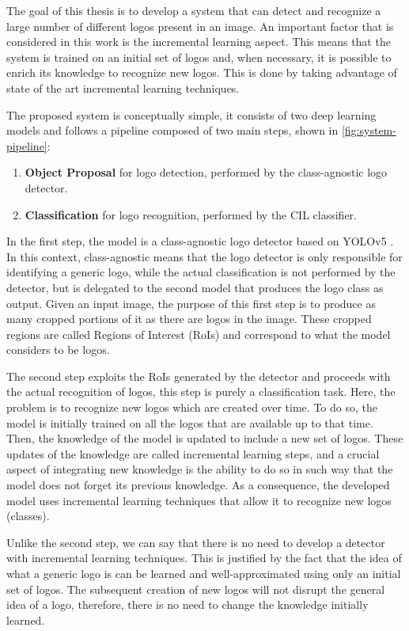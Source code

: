 The goal of this thesis is to develop a system that can detect and recognize 
a large number of different logos present in an image. An important factor that is considered in this work is the incremental learning aspect. This means that the system is trained on an initial set of logos and, when necessary, it is possible to enrich its knowledge to recognize new logos. This is done by taking advantage of state of the art incremental learning techniques.

The proposed system is conceptually simple, it consists of two deep learning models and follows a pipeline composed of two main steps, shown in \autoref{fig:system-pipeline}:

\begin{enumerate}
    \item \textbf{Object Proposal} for logo detection, performed by the class-agnostic logo detector.
    \item \textbf{Classification} for logo recognition, performed by the CIL classifier.
\end{enumerate}

In the first step, the model is a class-agnostic logo detector based on YOLOv5 \cite{glenn_jocher_2021_5563715}. In this context, class-agnostic means that the logo detector is only responsible for identifying a generic logo, while the actual classification is not performed by the detector, but is delegated to the second model that produces the logo class as output.
Given an input image, the purpose of this first step is to produce as many cropped portions of it as there are logos in the image. These cropped regions are called Regions of Interest (RoIs) and correspond to what the model considers to be logos.

The second step exploits the RoIs generated by the detector and proceeds with the actual recognition of logos, this step is purely a classification task.
Here, the problem is to recognize new logos which are created over time. To do so, the model is initially trained on all the logos that are available up to that time. Then, the knowledge of the model is updated to include a new set of logos. These updates of the knowledge are called incremental learning steps, and a crucial aspect of integrating new knowledge is the ability to do so in such way that the model does not forget its previous knowledge. As a consequence, the developed model uses incremental learning techniques that allow it to recognize new logos (classes).

Unlike the second step, we can say that there is no need to develop a detector with incremental learning techniques. This is justified by the fact that the idea of what a generic logo is can be learned and well-approximated using only an initial set of logos. The subsequent creation of new logos will not disrupt the general idea of a logo, therefore, there is no need to change the knowledge initially learned.

